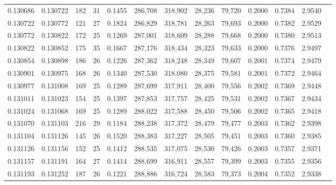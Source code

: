 \begin{tabular}{rrrrrrrrrrrrr}
0.130686 & 0.130722 & 182 &  31 &                                     0.1455 & 286,708 & 318,902 &  28,236 &  79,720 & 0.2000 & 0.7384 & 2.9540 \\
0.130722 & 0.130772 & 121 &  27 &                                     0.1824 & 286,829 & 318,781 &  28,263 &  79,693 & 0.2000 & 0.7382 & 2.9529 \\
0.130772 & 0.130822 & 172 &  25 &                                     0.1269 & 287,001 & 318,609 &  28,288 &  79,668 & 0.2000 & 0.7380 & 2.9513 \\
0.130822 & 0.130852 & 175 &  35 &                                     0.1667 & 287,176 & 318,434 &  28,323 &  79,633 & 0.2000 & 0.7376 & 2.9497 \\
0.130854 & 0.130898 & 186 &  26 &                                     0.1226 & 287,362 & 318,248 &  28,349 &  79,607 & 0.2001 & 0.7374 & 2.9479 \\
0.130901 & 0.130975 & 168 &  26 &                                     0.1340 & 287,530 & 318,080 &  28,375 &  79,581 & 0.2001 & 0.7372 & 2.9464 \\
0.130977 & 0.131008 & 169 &  25 &                                     0.1289 & 287,699 & 317,911 &  28,400 &  79,556 & 0.2002 & 0.7369 & 2.9448 \\
0.131011 & 0.131023 & 154 &  25 &                                     0.1397 & 287,853 & 317,757 &  28,425 &  79,531 & 0.2002 & 0.7367 & 2.9434 \\
0.131024 & 0.131068 & 169 &  25 &                                     0.1289 & 288,022 & 317,588 &  28,450 &  79,506 & 0.2002 & 0.7365 & 2.9418 \\
0.131070 & 0.131103 & 216 &  29 &                                     0.1184 & 288,238 & 317,372 &  28,479 &  79,477 & 0.2003 & 0.7362 & 2.9398 \\
0.131104 & 0.131126 & 145 &  26 &                                     0.1520 & 288,383 & 317,227 &  28,505 &  79,451 & 0.2003 & 0.7360 & 2.9385 \\
0.131126 & 0.131156 & 152 &  25 &                                     0.1412 & 288,535 & 317,075 &  28,530 &  79,426 & 0.2003 & 0.7357 & 2.9371 \\
0.131157 & 0.131191 & 164 &  27 &                                     0.1414 & 288,699 & 316,911 &  28,557 &  79,399 & 0.2003 & 0.7355 & 2.9356 \\
0.131193 & 0.131252 & 187 &  26 &                                     0.1221 & 288,886 & 316,724 &  28,583 &  79,373 & 0.2004 & 0.7352 & 2.9338 \\

\end{tabular}
